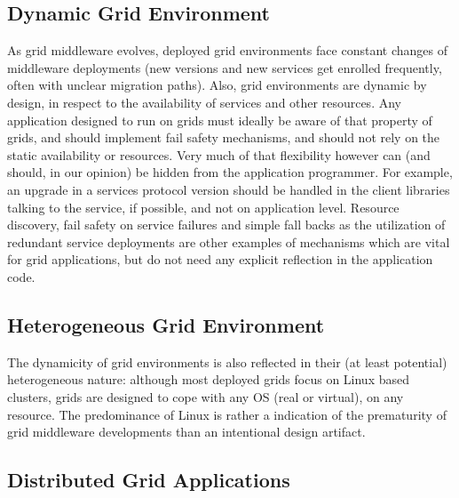  \subsection{Dynamic Grid Environment}

   As grid middleware evolves, deployed grid environments face constant
   changes of middleware deployments (new versions and new services
   get enrolled frequently, often with unclear migration paths).
   Also, grid environments are dynamic by design, in respect to the
   availability of services and other resources.  Any application
   designed to run on grids must ideally be aware of that property of
   grids, and should implement fail safety mechanisms, and should not
   rely on the static availability or resources.  Very much of that
   flexibility however can (and should, in our opinion) be hidden from
   the application programmer.  For example, an upgrade in a services
   protocol version should be handled in the client libraries talking
   to the service, if possible, and not on application level.
   Resource discovery, fail safety on service failures and simple fall
   backs as the utilization of redundant service deployments are other
   examples of mechanisms which are vital for grid applications, but
   do not need any explicit reflection in the application code. 
   


 \subsection{Heterogeneous Grid Environment}

   The dynamicity of grid environments is also reflected in their (at
   least potential) heterogeneous nature: although most deployed grids
   focus on Linux based clusters, grids are designed to cope with any
   OS (real or virtual), on any resource.  The predominance of Linux is
   rather a indication of the prematurity of grid middleware
   developments than an intentional design artifact. 



 \subsection{Distributed Grid Applications}

